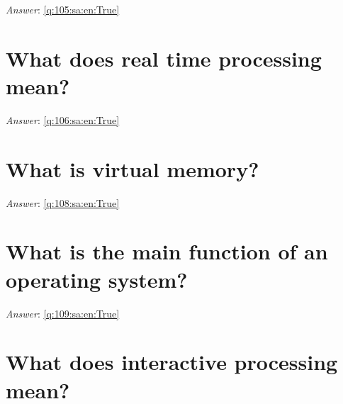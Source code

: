 \documentclass[a4paper,11pt,oneside]{book}
\begin{document}
\begin{sloppypar}
\vspace{1cm}

\textit{Answer}: \autoref{q:105:sa:en:True}



\section{What does real time processing mean?}

\label{q:106:sa:en:False}

\vspace{2cm}

\noindent\makebox[\textwidth]{\hrulefill}

\vspace{1cm}

\textit{Answer}: \autoref{q:106:sa:en:True}



\section{What is virtual memory?}

\label{q:108:sa:en:False}

\vspace{2cm}

\noindent\makebox[\textwidth]{\hrulefill}

\vspace{1cm}

\textit{Answer}: \autoref{q:108:sa:en:True}



\section{What is the main function of an operating system?}

\label{q:109:sa:en:False}

\vspace{2cm}

\noindent\makebox[\textwidth]{\hrulefill}

\vspace{1cm}

\textit{Answer}: \autoref{q:109:sa:en:True}



\section{What does interactive processing mean?}


\end{sloppypar}
\end{document}
